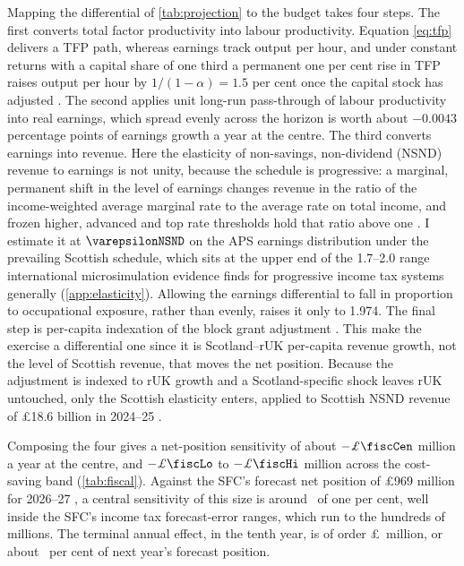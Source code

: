 Mapping the differential of \cref{tab:projection} to the budget takes four steps. The first converts total factor productivity into labour productivity. Equation \eqref{eq:tfp} delivers a TFP path, whereas earnings track output per hour, and under constant returns with a capital share of one third a permanent one per cent rise in TFP raises output per hour by $1/(1-\alpha) = 1.5$ per cent once the capital stock has adjusted \citep{obr2025}. The second applies unit long-run pass-through of labour productivity into real earnings, which spread evenly across the horizon is worth about $-0.0043$ percentage points of earnings growth a year at the centre. The third converts earnings into revenue. Here the elasticity of non-savings, non-dividend (NSND) revenue to earnings is not unity, because the schedule is progressive: a marginal, permanent shift in the level of earnings changes revenue in the ratio of the income-weighted average marginal rate to the average rate on total income, and frozen higher, advanced and top rate thresholds hold that ratio above one \citep{sgreadyreckoner2026}. I estimate it at $\varepsilonNSND$ on the APS earnings distribution under the prevailing Scottish schedule, which sits at the upper end of the 1.7--2.0 range international microsimulation evidence finds for progressive income tax systems generally (\cref{app:elasticity}). Allowing the earnings differential to fall in proportion to occupational exposure, rather than evenly, raises it only to 1.974. The final step is per-capita indexation of the block grant adjustment \citep{gov2023}. This make the exercise a differential one since it is Scotland--rUK per-capita revenue growth, not the level of Scottish revenue, that moves the net position. Because the adjustment is indexed to rUK growth and a Scotland-specific shock leaves rUK untouched, only the Scottish elasticity enters, applied to Scottish NSND revenue of \pounds18.6 billion in 2024--25 \citep{hmrcoutturn2025}.

Composing the four gives a net-position sensitivity of about $-\pounds\fiscCen$ million a year at the centre, and $-\pounds\fiscLo$ to $-\pounds\fiscHi$ million across the cost-saving band (\cref{tab:fiscal}). Against the SFC's forecast net position of \pounds969 million for 2026--27 \citep{sfc2026}, a central sensitivity of this size is around \fiscPctAnn\ of one per cent, well inside the SFC's income tax forecast-error ranges, which run to the hundreds of millions. The terminal annual effect, in the tenth year, is of order \pounds\termCen\ million, or about \fiscPctTerm\ per cent of next year's forecast position.

